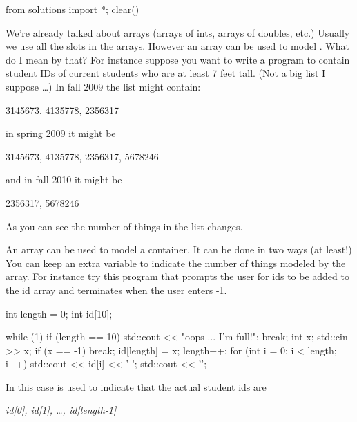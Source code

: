 \begin{python0}
from solutions import *; clear()
\end{python0}

We're already talked about arrays (arrays of ints, arrays of doubles, etc.) Usually we use all the slots in the arrays. However an array can be used to model . What do I mean by that? For instance suppose you want to write a program to contain student IDs of current students who are at least 7 feet tall. (Not a big list I suppose \ldots) In fall 2009 the list might contain:

\begin{center}
3145673, 4135778, 2356317
\end{center}

in spring 2009 it might be

\begin{center}
3145673, 4135778, 2356317, 5678246
\end{center}

and in fall 2010 it might be

\begin{center}
2356317, 5678246
\end{center}

As you can see the number of things in the list changes.

An array can be used to model a container. It can be done in two ways (at least!) You can keep an extra variable to indicate the number of things modeled by the array. For instance try this program that prompts the user for ids to be added to the id array and terminates when the user enters -1.

\begin{consolethree}[escapeinside=||]
int length = 0;
int id[10];

while (1)
{
    if (length == 10)
    {
        std::cout << "oops ... I'm full!\n";
        break;
    }
    int x;
    std::cin >> x;
    if (x == -1) break;
    id[length] = x;
    length++;
    for (int i = 0; i < length; i++)
    {
        std::cout << id[i] << ' ';
    }
    std::cout << '\n';
}
\end{consolethree}

In this case \texttt{} is used to indicate that the actual student ids are

\begin{center}
\textit{id[0], id[1], \ldots, id[length-1]}
\end{center}

